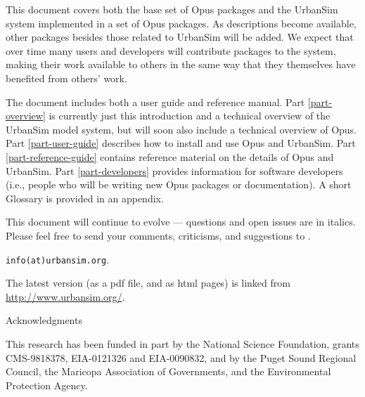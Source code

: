 This document covers both the base set of Opus packages and the UrbanSim
system implemented in a set of Opus packages.  As descriptions
become available, other packages besides those related to UrbanSim will be
added.  We expect that over time many users and developers will contribute
packages to the system, making their work available to others in the same
way that they themselves have benefited from others' work.

The document includes both a user guide and reference manual.  Part
\ref{part-overview} is currently just this introduction and a
technical overview of the UrbanSim model system, but will soon also
include a technical overview of Opus. Part \ref{part-user-guide}
describes how to install and use Opus and UrbanSim.  Part
\ref{part-reference-guide} contains reference material on the
details of Opus and UrbanSim. Part \ref{part-developers} provides
information for software developers (i.e., people who will be
writing new Opus packages or documentation).  A short Glossary is
provided in an appendix.

This document will continue to evolve --- questions and open issues are in
italics.  Please feel free to send your comments, 
criticisms, and
suggestions to
. 
\begin{htmlonly}
{\tt info(at)urbansim.org}. 
\end{htmlonly}

The latest version (as a pdf file, and as html pages) is linked from
\url{http://www.urbansim.org/}.

\newpage
{\huge Acknowledgments}

This research has been funded in part by the National Science Foundation, 
grants CMS-9818378, EIA-0121326 and EIA-0090832, and by the Puget
Sound Regional Council, the Maricopa Association of Governments, and the 
Environmental Protection Agency.  

